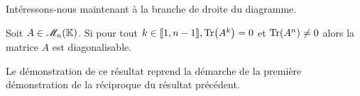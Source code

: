 Intéressons-nous maintenant à la branche de droite du diagramme.
\begin{prop}{}
    Soit $A \in \mathscr{M}_n(\mathbb{K})$. Si pour tout $k \in \llbracket 1, n-1 \rrbracket, \Tr(A^k) = 0$ et $\Tr(A^n) \not= 0$ alors la matrice $A$ est diagonalisable. 
\end{prop}
Le démonstration de ce résultat reprend la démarche de la première démonstration de la réciproque du résultat précédent.
\newcommand{\vandermondepartiel}{
\left(\begin{gathered}
    \tikzpicture[every node/.style={anchor=south west}]
        \node[minimum width=1.5cm,minimum height=0.5cm] at (0.125,1.25) {\LARGE $V_k$};
        
        \node[minimum width=0.5cm,minimum height=0.5cm] at (0,0) {$\star$};
        \node[minimum width=0.5cm,minimum height=0.5cm] at (0.55,0) {$\cdots$};
        \node[minimum width=0.5cm,minimum height=0.5cm] at (1.25,0) {$\star$};
        
        \node[minimum width=0.5cm,minimum height=0.5cm] at (0,0.375) {$\vdots$};
        \node[minimum width=0.5cm,minimum height=0.5cm] at (1.25,0.375) {$\vdots$};
        
        \node[minimum width=0.5cm,minimum height=0.5cm] at (0,0.75) {$\star$};
        \node[minimum width=0.5cm,minimum height=0.5cm] at (0.55,0.75) {$\cdots$};
        \node[minimum width=0.5cm,minimum height=0.5cm] at (1.25,0.75) {$\star$};

        \draw (0, 1.25) -- (1.75, 1.25);
    \endtikzpicture
    \end{gathered}\right)
}
